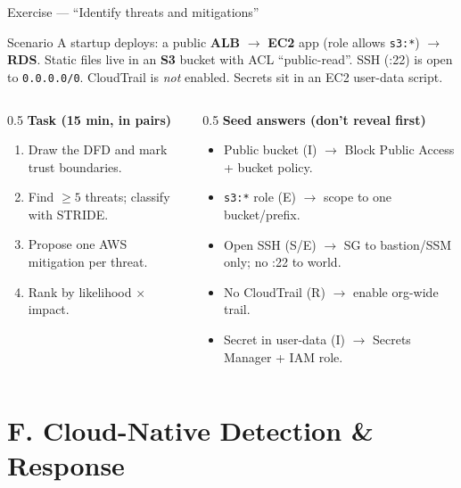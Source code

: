 \documentclass[aspectratio=169,10pt]{beamer}
\newcommand{\svc}[1]{{\color{accent}\textsf{\textbf{#1}}}}      %
\begin{document}
\begin{frame}{Exercise --- ``Identify threats and mitigations''}
  \begin{exampleblock}{Scenario}
    \small A startup deploys: a public \svc{ALB} $\to$ \svc{EC2} app (role allows \texttt{s3:*})
    $\to$ \svc{RDS}. Static files live in an \svc{S3} bucket with ACL ``public-read''. SSH (:22) is
    open to \texttt{0.0.0.0/0}. CloudTrail is \emph{not} enabled. Secrets sit in an EC2 user-data script.
  \end{exampleblock}
  \begin{columns}[T]
    \begin{column}{0.5\textwidth}\small
      \textbf{Task (15 min, in pairs)}
      \begin{enumerate}\setlength\itemsep{1pt}
        \item Draw the DFD and mark trust boundaries.
        \item Find $\geq 5$ threats; classify with STRIDE.
        \item Propose one AWS mitigation per threat.
        \item Rank by likelihood $\times$ impact.
      \end{enumerate}
    \end{column}
    \begin{column}{0.5\textwidth}\footnotesize
      \textbf{Seed answers (don't reveal first)}
      \begin{itemize}
        \item Public bucket (I) $\to$ Block Public Access + bucket policy.
        \item \texttt{s3:*} role (E) $\to$ scope to one bucket/prefix.
        \item Open SSH (S/E) $\to$ SG to bastion/SSM only; no :22 to world.
        \item No CloudTrail (R) $\to$ enable org-wide trail.
        \item Secret in user-data (I) $\to$ Secrets Manager + IAM role.
      \end{itemize}
    \end{column}
  \end{columns}
\end{frame}

\section{F. Cloud-Native Detection \& Response}
\end{document}
